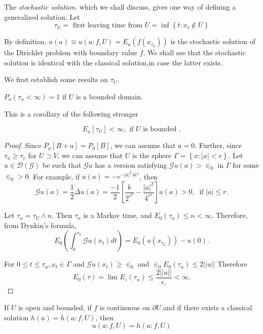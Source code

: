 The \textit{stochastic solution}. which we shall discuss, gives one
way of defining a generalized solution. Let 
$$
\tau_U = \text{ first leaving time from } U = \inf \left \{ t : x_t
\notin U \right\} 
$$

By definition, $u(a) \equiv u (a : f, U) = E_a (f (x_{\tau_u}))$ is
the stochastic solution of the Dirichlet problem with boundary value
$f$. We shall see that the stochastic solution is identical with the
classical solution,\pageoriginale in case the latter exists. 

We first establish some results on $\tau_U$.

\setcounter{thm}{0}
\begin{thm}\label{chap3-sec3-thm1} %
$P_a (\tau_u < \infty) = 1$ if $U$ is a bounded domain.
\end{thm}

This is a corollary of the following stronger

\begin{thm}\label{chap3-sec3-thm2}%
$$
E_a [\tau_U] <\infty,\text{ \ if } U \text{ is bounded }.
$$
\end{thm}

\begin{proof}
Since $P_a[B+a] = P_0 [B]$, we can assume that $a = 0$. Further,
  since $\tau_u \geq \tau_v$ for $U \supset V$, we can assume that $U$
  is the sphere $\Gamma = \left\{ x : |x| < r \right\}$. Let $u \in
  \mathscr{D}(\mathscr{G})$ be such that $\mathscr{G}u$ has a version
  satisfying $\mathscr{G}u(a) > \in_0$ in $\Gamma$ for some $\in_0 >
  0$.  For example, if $u(a)=-e^{-|a|^\frac{2}/{4r^2}}$, then 
  $$
  \mathscr{G}u(a)= \frac{1}{2}\Delta u(a) =
  \frac{-1}{2}\left[\frac{k}{2^{r^2}}-\frac{|a|^2}{4^{r^4}}\right]
  u(a) > 0, ~\text{ if } |a| \leq r. 
  $$

Let $\tau_n = \tau_U \wedge n$. Then $\tau_n$ is a
Markov time, and $E_0(\tau_n) \leq n < \infty$. Therefore, from
Dynkin's formula, 
$$
E_0\left(\int^{\tau_n}_0 \mathscr{G}u(x_t) dt\right) = E_0 (u(x_{\tau_u})) - u(0).
$$

For $0 \leq t \leq \tau_n, x_t \in \Gamma$ and $\mathscr{G}u(x_t) \geq
\in_0$ and $\in_0 E_0 (\tau_n) \leq 2 || u||$ Therefore 
$$
E_0 (\tau) = \lim E_\circ (\tau_n) \leq  \frac{2 || u
  ||}{\epsilon_\circ} < \infty.
$$
\end{proof}

\begin{thm}\label{chap3-sec3-thm3} %
  If $U$ is open and bounded, if $f$ is continuous on $\partial U$
  and\pageoriginale 
  if there exists a classical solution $h(a) = h(a : f, U)$, then 
  $$
  u(a : f, U) = h(a : f, U)
  $$
\end{thm}

